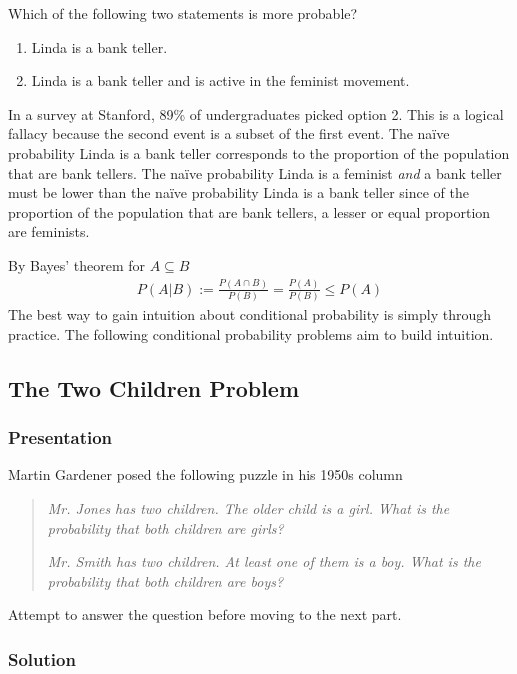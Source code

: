 Which of the following two statements is more probable?
\begin{enumerate}
\item Linda is a bank teller.
\item Linda is a bank teller and is active in the feminist movement.
\end{enumerate}

In a survey at Stanford, 
89\% of undergraduates picked option 2. 
This is a logical fallacy because the second event is 
a subset of the first event. 
The naïve probability Linda is a bank teller corresponds to the proportion of the population that are bank tellers. 
The naïve probability Linda is a feminist \emph{and} a bank teller must be lower than
the naïve probability Linda is a bank teller since of the proportion of the population that are bank tellers, 
a lesser or equal proportion are feminists.

By Bayes' theorem for \(A \subseteq B\)
\begin{align}
P(A|B) := \frac{P(A\cap B)}{P(B)} = \frac{P(A)}{P(B)} \leq P(A)
\end{align}
The best way to gain intuition about conditional probability is simply through practice. 
The following conditional probability problems aim to build intuition.

\subsection{The Two Children Problem}%

\subsubsection{Presentation}

Martin Gardener posed the following puzzle in his 1950s column

\begin{quote}
\emph{Mr. Jones has two children. The older child is a girl. What is the
probability that both children are girls?}

\emph{Mr. Smith has two children. At least one of them is a boy. What is
the probability that both children are boys?}
\end{quote}

Attempt to answer the question before moving to the next part.

\clearpage
\subsubsection{Solution}

